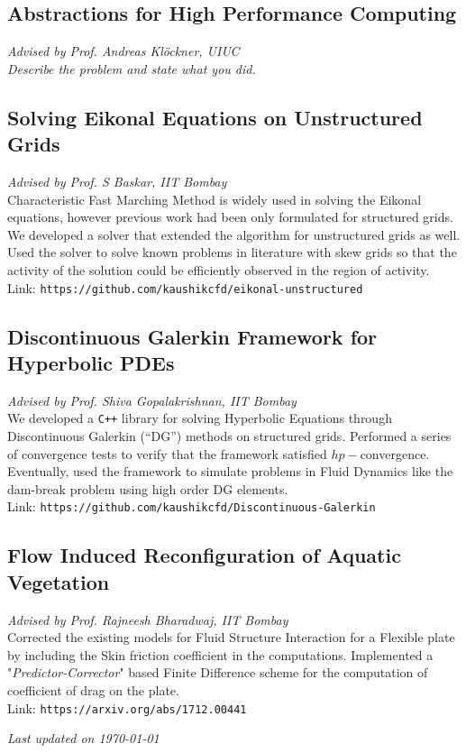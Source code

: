 \documentclass[letterpaper, 12pt]{article}
\newcommand{\updatenote}[1][\today]{\par\vfill{\scriptsize \textit{Last updated on #1}}}
\begin{document}
\subsection*{Abstractions for High Performance Computing}
\vspace{-1ex}
\small \textit{Advised by Prof. Andreas Kl\"{o}ckner, UIUC}\\
\textit{Describe the problem and state what you did.}


\subsection*{Solving Eikonal Equations on Unstructured Grids}
\vspace{-1ex}
\small \textit{Advised by Prof. S Baskar, IIT Bombay}\\
Characteristic Fast Marching Method is widely used in solving the Eikonal
equations, however previous work had been only formulated for structured
grids. We developed a solver that extended the algorithm for
unstructured grids as well. Used the solver to solve known problems in
literature with skew grids so that the activity of the solution could be
efficiently observed in the region of activity.\\
Link: \texttt{https://github.com/kaushikcfd/eikonal-unstructured}


\subsection*{Discontinuous Galerkin Framework for Hyperbolic PDEs}
\vspace{-1ex}
\small \textit{Advised by Prof. Shiva Gopalakrishnan, IIT Bombay}\\
We developed a \texttt{C++} library for solving Hyperbolic Equations through
Discontinuous Galerkin (``DG'') methods on structured grids.  Performed a series
of convergence tests to verify that the framework satisfied $hp-$convergence.
Eventually, used the framework to simulate problems in Fluid Dynamics like
the dam-break problem using high order DG elements.\\
Link: \texttt{https://github.com/kaushikcfd/Discontinuous-Galerkin}


\subsection*{Flow Induced Reconfiguration of Aquatic Vegetation}
\vspace{-1ex}
\small \textit{Advised by Prof. Rajneesh Bharadwaj, IIT Bombay}\\
Corrected the existing models for Fluid Structure Interaction for a Flexible plate by including the Skin friction coefficient in the computations. Implemented a "\textit{Predictor-Corrector}" based Finite Difference scheme for the computation of coefficient of drag on the plate.\\
Link: \texttt{https://arxiv.org/abs/1712.00441}


\updatenote
\end{document}
